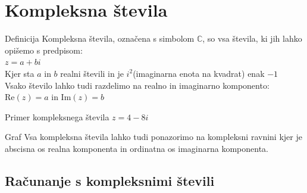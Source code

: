 \documentclass{article}
\begin{document}
\section{Kompleksna števila}
\begin{minipage}[t]{0.45\textwidth}
\vspace{0pt}
\begin{defbox}{Definicija}
    \centering
    Kompleksna števila, označena s simbolom $\mathbb{C}$, so vsa števila, ki jih lahko opišemo s predpisom:\\[8pt]
    $z=a+bi$\\[8pt]
    Kjer sta $a$ in $b$ realni števili in je $i^2$(imaginarna enota na kvadrat) enak $-1$\\[10pt]
    Vsako število lahko tudi razdelimo na realno in imaginarno komponento:\\
    $\text{Re}(z)=a$ in $\text{Im}(z)=b$
\end{defbox}
\begin{zgledbox}{Primer kompleksnega števila}
\centering
$z=4-8i$
\end{zgledbox}
\end{minipage}
\hfill
\begin{minipage}[t]{0.45\textwidth}
\vspace{0pt}
\begin{rpbox}{Graf}
    \centering
    Vsa kompleksna števila lahko tudi ponazorimo na kompleksni ravnini kjer je abscisna os realna komponenta in ordinatna os imaginarna komponenta.
\end{rpbox}
\end{minipage}

\newpage

\subsection{Računanje s kompleksnimi števili}
\end{document}
